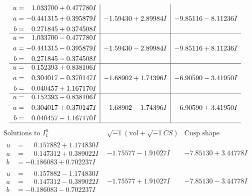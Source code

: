 \documentclass[1p]{elsarticle_modified}
\theoremstyle{definition}
\newcommand{\I}{\sqrt{-1}}
\begin{document}
$$\begin{array}{c|c|c}
\begin{aligned}
u &= \phantom{-}1.033700 + 0.477780 I \\
a &= -0.441315 + 0.395879 I \\
b &= \phantom{-}0.271845 + 0.374508 I\end{aligned}
 & -1.59430 + 2.89984 I & -9.85116 - 8.11236 I \\ \hline\begin{aligned}
u &= \phantom{-}1.033700 - 0.477780 I \\
a &= -0.441315 - 0.395879 I \\
b &= \phantom{-}0.271845 - 0.374508 I\end{aligned}
 & -1.59430 - 2.89984 I & -9.85116 + 8.11236 I \\ \hline\begin{aligned}
u &= \phantom{-}0.152393 + 0.838106 I \\
a &= \phantom{-}0.304017 - 0.370147 I \\
b &= \phantom{-}0.040457 + 1.167170 I\end{aligned}
 & -1.68902 + 1.74396 I & -6.90590 - 3.41950 I \\ \hline\begin{aligned}
u &= \phantom{-}0.152393 - 0.838106 I \\
a &= \phantom{-}0.304017 + 0.370147 I \\
b &= \phantom{-}0.040457 - 1.167170 I\end{aligned}
 & -1.68902 - 1.74396 I & -6.90590 + 3.41950 I\\
 \hline 
 \end{array}$$\newpage$$\begin{array}{c|c|c}  
\text{Solutions to }I^u_{1}& \I (\text{vol} + \sqrt{-1}CS) & \text{Cusp shape}\\
 \hline 
\begin{aligned}
u &= \phantom{-}0.157882 + 1.174830 I \\
a &= \phantom{-}0.147312 + 0.389022 I \\
b &= -0.186083 + 0.702237 I\end{aligned}
 & -1.75577 - 1.91027 I & -7.85130 + 3.44778 I \\ \hline\begin{aligned}
u &= \phantom{-}0.157882 - 1.174830 I \\
a &= \phantom{-}0.147312 - 0.389022 I \\
b &= -0.186083 - 0.702237 I\end{aligned}
 & -1.75577 + 1.91027 I & -7.85130 - 3.44778 I \\ \hline\begin{aligned}

\end{aligned}
\end{array}$$
\end{document}
